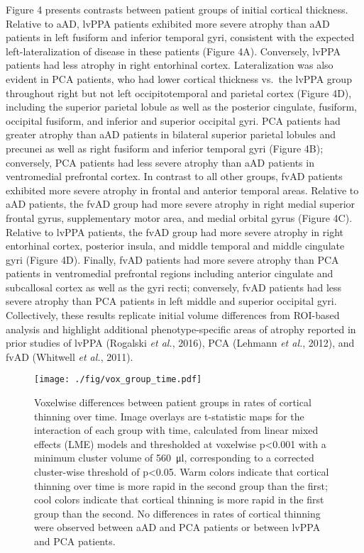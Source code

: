 \documentclass[]{article}
\begin{document}
Figure 4 presents contrasts between patient groups of initial cortical
thickness. Relative to aAD, lvPPA patients exhibited more severe atrophy
than aAD patients in left fusiform and inferior temporal gyri,
consistent with the expected left-lateralization of disease in these
patients (Figure 4A). Conversely, lvPPA patients had less atrophy in
right entorhinal cortex. Lateralization was also evident in PCA
patients, who had lower cortical thickness vs.~the lvPPA group
throughout right but not left occipitotemporal and parietal cortex
(Figure 4D), including the superior parietal lobule as well as the
posterior cingulate, fusiform, occipital fusiform, and inferior and
superior occipital gyri. PCA patients had greater atrophy than aAD
patients in bilateral superior parietal lobules and precunei as well as
right fusiform and inferior temporal gyri (Figure 4B); conversely, PCA
patients had less severe atrophy than aAD patients in ventromedial
prefrontal cortex. In contrast to all other groups, fvAD patients
exhibited more severe atrophy in frontal and anterior temporal areas.
Relative to aAD patients, the fvAD group had more severe atrophy in
right medial superior frontal gyrus, supplementary motor area, and
medial orbital gyrus (Figure 4C). Relative to lvPPA patients, the fvAD
group had more severe atrophy in right entorhinal cortex, posterior
insula, and middle temporal and middle cingulate gyri (Figure 4D).
Finally, fvAD patients had more severe atrophy than PCA patients in
ventromedial prefrontal regions including anterior cingulate and
subcallosal cortex as well as the gyri recti; conversely, fvAD patients
had less severe atrophy than PCA patients in left middle and superior
occipital gyri. Collectively, these results replicate initial volume
differences from ROI-based analysis and highlight additional
phenotype-specific areas of atrophy reported in prior studies of lvPPA
(Rogalski \emph{et al.}, 2016), PCA (Lehmann \emph{et al.}, 2012), and
fvAD (Whitwell \emph{et al.}, 2011).

\begin{figure}[]

{\centering \texttt{[image: ./fig/vox\_group\_time.pdf]} 

}

\caption[GM group x time differences]{Voxelwise differences between patient groups in rates of cortical thinning over time. Image overlays are t-statistic maps for the interaction of each group with time, calculated from linear mixed effects (LME) models and thresholded at voxelwise p<0.001 with a minimum cluster volume of \SI{560}{\micro\litre}, corresponding to a corrected cluster-wise threshold of p<0.05. Warm colors indicate that cortical thinning over time is more rapid in the second group than the first; cool colors indicate that cortical thinning is more rapid in the first group than the second. No differences in rates of cortical thinning were observed between aAD and PCA patients or between lvPPA and PCA patients. \label{gm_group_time}}

\end{figure}
\end{document}
